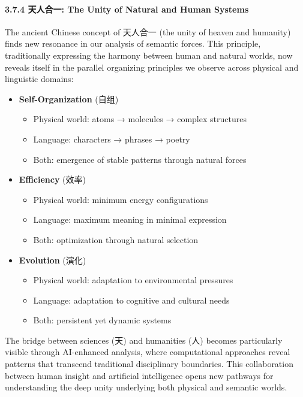 \documentclass[
  11pt,
  letterpaper,
]{article}
\providecommand{\tightlist}{%
  \setlength{\itemsep}{0pt}\setlength{\parskip}{0pt}}
\begin{document}
\hypertarget{ux5929ux4ebaux5408ux4e00-the-unity-of-natural-and-human-systems}{%
\paragraph{3.7.4 天人合一: The Unity of Natural and Human
Systems}\label{ux5929ux4ebaux5408ux4e00-the-unity-of-natural-and-human-systems}}

The ancient Chinese concept of 天人合一 (the unity of heaven and
humanity) finds new resonance in our analysis of semantic forces. This
principle, traditionally expressing the harmony between human and
natural worlds, now reveals itself in the parallel organizing principles
we observe across physical and linguistic domains:

\begin{itemize}
\tightlist
\item
  \textbf{Self-Organization} (自组)

  \begin{itemize}
  \tightlist
  \item
    Physical world: atoms → molecules → complex structures
  \item
    Language: characters → phrases → poetry
  \item
    Both: emergence of stable patterns through natural forces
  \end{itemize}
\item
  \textbf{Efficiency} (效率)

  \begin{itemize}
  \tightlist
  \item
    Physical world: minimum energy configurations
  \item
    Language: maximum meaning in minimal expression
  \item
    Both: optimization through natural selection
  \end{itemize}
\item
  \textbf{Evolution} (演化)

  \begin{itemize}
  \tightlist
  \item
    Physical world: adaptation to environmental pressures
  \item
    Language: adaptation to cognitive and cultural needs
  \item
    Both: persistent yet dynamic systems
  \end{itemize}
\end{itemize}

The bridge between sciences (天) and humanities (人) becomes
particularly visible through AI-enhanced analysis, where computational
approaches reveal patterns that transcend traditional disciplinary
boundaries. This collaboration between human insight and artificial
intelligence opens new pathways for understanding the deep unity
underlying both physical and semantic worlds.
\end{document}
